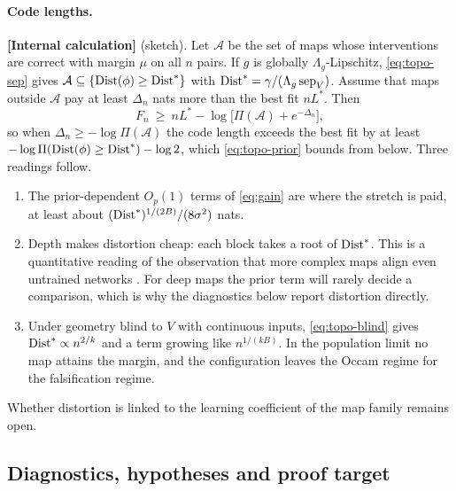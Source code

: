 \documentclass[11pt,a4paper]{article}
\newcommand{\evl}[2]{{\small\bfseries\color{#1}[#2]}}
\newcommand{\LCalc}{\evl{ccalc}{Internal calculation}}
\begin{document}
\paragraph{Code lengths.} \LCalc{} (sketch). Let $\mathcal A$ be the set of
maps whose interventions are correct with margin $\mu$ on all $n$ pairs. If
$g$ is globally $\Lambda_g$-Lipschitz, \eqref{eq:topo-sep} gives
$\mathcal A\subseteq\{\operatorname{Dist}(\phi)\ge \operatorname{Dist}^*\}$ with $\operatorname{Dist}^*=\gamma/(\Lambda_g\operatorname{sep}_V)$.
Assume that maps outside $\mathcal A$ pay at least $\Delta_n$ nats more than
the best fit $nL^*$. Then
\[
F_n\ \ge\ nL^*-\log\bigl[\Pi(\mathcal A)+e^{-\Delta_n}\bigr],
\]
so when $\Delta_n\ge-\log\Pi(\mathcal A)$ the code length exceeds the best
fit by at least $-\log\Pi(\operatorname{Dist}(\phi)\ge \operatorname{Dist}^*)-\log2$, which
\eqref{eq:topo-prior} bounds from below. Three readings follow.
\begin{enumerate}[leftmargin=*]
\item The prior-dependent $O_p(1)$ terms of \eqref{eq:gain} are where the
stretch is paid, at least about $(\operatorname{Dist}^*)^{1/(2B)}/(8\sigma^2)$ nats.
\item Depth makes distortion cheap: each block takes a root of $\operatorname{Dist}^*$. This is
a quantitative reading of the observation that more complex maps align even
untrained networks \cite{sutter2025}. For deep maps the prior term will rarely
decide a comparison, which is why the diagnostics below report distortion
directly.
\item Under geometry blind to $V$ with continuous inputs,
\eqref{eq:topo-blind} gives $\operatorname{Dist}^*\propto n^{2/k}$ and a term growing like
$n^{1/(kB)}$. In the population limit no map attains the margin, and the
configuration leaves the Occam regime for the falsification regime.
\end{enumerate}
Whether distortion is linked to the learning coefficient of the map family
remains open.

\subsection{Diagnostics, hypotheses and proof target}
\label{app:topo-protocol}
\end{document}
